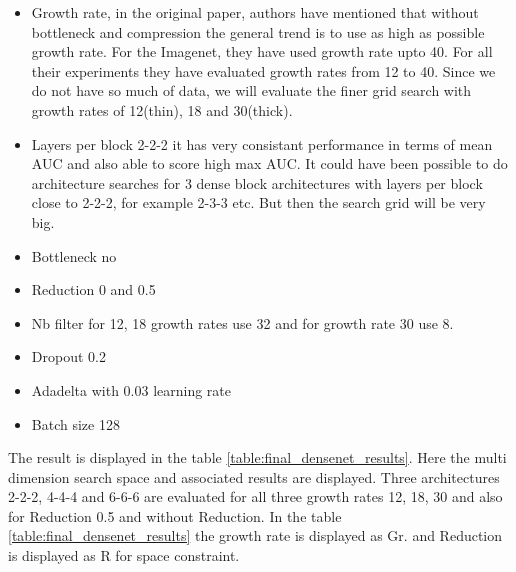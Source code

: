 \begin{itemize}
 \item Growth rate, in the original paper, authors have mentioned that without bottleneck and compression the general trend is to use as high as possible growth rate. For the Imagenet, they have used growth rate 
 upto 40. For all their experiments they have evaluated growth rates from 12 to 40. Since we do not have so much of data, we will evaluate the finer grid search with growth rates of 12(thin), 18 and 30(thick). 
 \item Layers per block 2-2-2 it has very consistant performance in terms of mean AUC and also able to score high max AUC. It could have been possible to do architecture searches for 3 dense block architectures 
 with layers per block close to 2-2-2, for example 2-3-3 etc. But then the search grid will be very big.
 \item Bottleneck no
 \item Reduction 0 and 0.5
 \item Nb filter for 12, 18 growth rates use 32 and for growth rate 30 use 8.
 \item Dropout 0.2
 \item Adadelta with 0.03 learning rate
 \item Batch size 128
\end{itemize}

The result is displayed in the table \ref{table:final_densenet_results}. Here the multi dimension search space and associated results are displayed. Three architectures 2-2-2, 4-4-4 and 6-6-6 are evaluated for
all three growth rates 12, 18, 30 and also for Reduction 0.5 and without Reduction. In the table \ref{table:final_densenet_results} the growth rate is displayed as Gr. and Reduction is displayed as R for space 
constraint.


